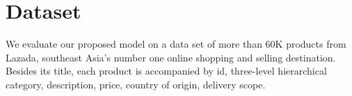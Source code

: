 \documentclass[sigconf]{acmart}
\begin{document}

\section{Dataset}
We evaluate our proposed model on a data set of more than 60K products from Lazada, southeast Asia's number one online shopping and selling destination.  Besides its title, each product is accompanied by id, three-level hierarchical category, description, price, country of origin, delivery scope. %
\end{document}
